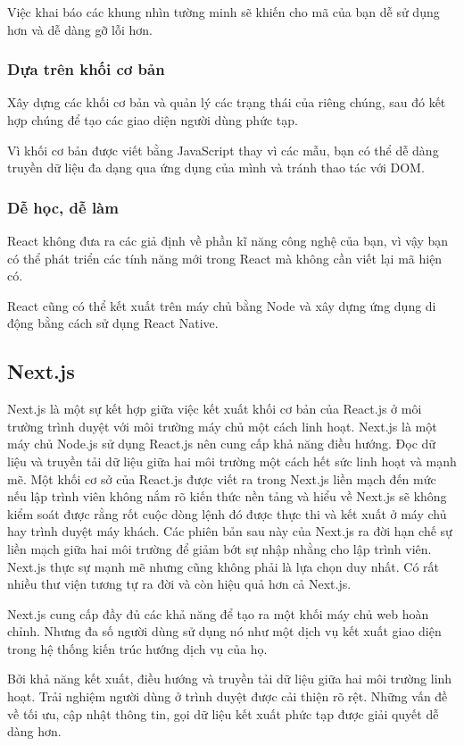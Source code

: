 {{Việc khai báo các khung nhìn tường minh sẽ khiến cho mã của bạn dễ sử dụng hơn và dễ dàng gỡ lỗi hơn.

\subsubsection{Dựa trên khối cơ bản}
Xây dựng các khối cơ bản và quản lý các trạng thái của riêng chúng, sau đó kết hợp chúng để tạo các giao diện người dùng phức tạp.

Vì khối cơ bản được viết bằng JavaScript thay vì các mẫu, bạn có thể dễ dàng truyền dữ liệu đa dạng qua ứng dụng của mình và tránh thao tác với DOM.

\subsubsection{Dễ học, dễ làm}
React không đưa ra các giả định về phần kĩ năng công nghệ của bạn, vì vậy bạn có thể phát triển các tính năng mới trong React mà không cần viết lại mã hiện có.

React cũng có thể kết xuất trên máy chủ bằng Node và xây dựng ứng dụng di động bằng cách sử dụng React Native.

\subsection{Next.js}
Next.js là một sự kết hợp giữa việc kết xuất khối cơ bản của React.js ở môi trường trình duyệt với môi trường máy chủ một cách linh hoạt.
Next.js là một máy chủ Node.js sử dụng React.js nên cung cấp khả năng điều hướng. Đọc dữ liệu và truyền tải dữ liệu giữa hai môi trường một cách hết sức linh hoạt và mạnh mẽ.
Một khối cơ sở của React.js được viết ra trong Next.js liền mạch đến mức nếu lập trình viên không nắm rõ kiến thức nền tảng và hiểu về Next.js sẽ không kiểm soát được rằng rốt cuộc dòng lệnh đó được thực thi và kết xuất ở máy chủ hay trình duyệt máy khách.
Các phiên bản sau này của Next.js ra đời hạn chế sự liền mạch giữa hai môi trường để giảm bớt sự nhập nhằng cho lập trình viên.
Next.js thực sự mạnh mẽ nhưng cũng không phải là lựa chọn duy nhất. Có rất nhiều thư viện tương tự ra đời và còn hiệu quả hơn cả Next.js.

Next.js cung cấp đầy đủ các khả năng để tạo ra một khối máy chủ web hoàn chỉnh. Nhưng đa số người dùng sử dụng nó như một dịch vụ kết xuất giao diện trong hệ thống kiến trúc hướng dịch vụ của họ.

Bởi khả năng kết xuất, điều hướng và truyền tải dữ liệu giữa hai môi trường linh hoạt. Trải nghiệm người dùng ở trình duyệt được cải thiện rõ rệt. Những vấn đề về tối ưu, cập nhật thông tin, gọi dữ liệu kết xuất phức tạp được giải quyết dễ dàng hơn.

}}
